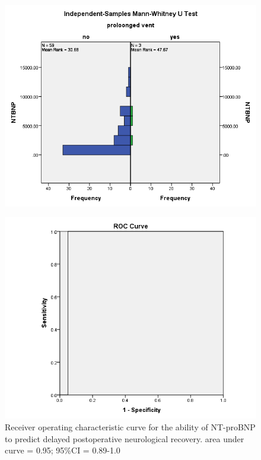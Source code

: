 \documentclass[14pt,a4paper,onecolumn]{extarticle}
\begin{document}
\clearpage
\begin{figure}
    \centering
    \includegraphics[scale=0.7]{./images/manwhit_vent.png}
    \caption{}
    \label{}
\end{figure}

\clearpage
\begin{figure}
    \centering
    \includegraphics[scale=0.7]{./images/roc_recovery.png}
    \caption{Receiver operating characteristic curve for the ability of NT-proBNP to predict delayed postoperative neurological recovery.  area under curve = 0.95; 95\%CI = 0.89-1.0}
    \label{}
\end{figure}
\end{document}
